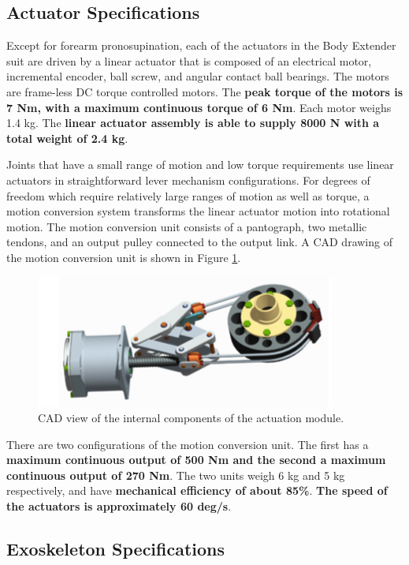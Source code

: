 \begin{refsection}
\subsection{Actuator Specifications}
 
 Except for forearm pronosupination, each of the actuators in the Body Extender suit are driven by a linear actuator that is composed of an electrical motor, incremental encoder, ball screw, and angular contact ball bearings.  The motors are frame-less DC torque controlled motors.  The {\bf peak torque of the motors is 7 Nm, with a maximum continuous torque of 6 Nm}.  Each motor weighs 1.4 kg.  The {\bf linear actuator assembly is able to supply 8000 N with a total weight of 2.4 kg}.
 
 Joints that have a small range of motion and low torque requirements use linear actuators in straightforward lever mechanism configurations.  For degrees of freedom which require relatively large ranges of motion as well as torque, a motion conversion system transforms the linear actuator motion into rotational motion.  The motion conversion unit consists of a pantograph, two metallic tendons, and an output pulley connected to the output link.  A CAD drawing of the motion conversion unit is shown in Figure \ref{fig:motionConv}. 
 \begin{figure}[thpb]
\centering
\includegraphics[width=3.in]{exos/figs/bodyExt/motionConv}
  \caption{CAD view of the internal components of the actuation module.}
 \label{fig:motionConv}   
 \end{figure}
 There are two configurations of the motion conversion unit.  The first has a {\bf maximum continuous output of 500 Nm and the second a maximum continuous output of 270 Nm}.  The two units weigh 6 kg and 5 kg respectively, and have {\bf mechanical efficiency of about 85\%}.  {\bf The speed of the actuators is approximately 60 deg/s}.
 
 
 \subsection{Exoskeleton Specifications}
 

\end{refsection}
